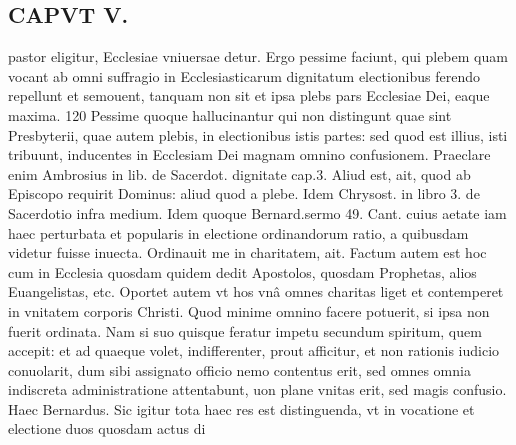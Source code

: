 \documentclass{article}
\begin{document}
\begin{pages}
\section*{CAPVT V. }
\marginpar{[ p.349 ]}\pstart pastor eligitur, Ecclesiae vniuersae detur. Ergo pessime faciunt, qui plebem quam vocant ab omni suffragio in Ecclesiasticarum dignitatum electionibus ferendo repellunt et semouent, tanquam non sit et ipsa plebs pars Ecclesiae Dei, eaque maxima. 120 Pessime quoque hallucinantur qui non distingunt quae sint Presbyterii, quae autem plebis, in electionibus istis partes: sed quod est illius, isti tribuunt, inducentes in Ecclesiam Dei magnam omnino confusionem. Praeclare enim Ambrosius in lib.  de Sacerdot. dignitate cap.3. Aliud est, ait, quod ab Episcopo requirit Dominus: aliud quod a plebe. Idem Chrysost. in libro 3. de Sacerdotio infra medium. Idem quoque Bernard.sermo 49. Cant. cuius aetate iam haec perturbata et popularis in electione ordinandorum ratio, a quibusdam videtur fuisse inuecta. Ordinauit me in charitatem, ait. Factum autem est hoc cum in Ecclesia quosdam quidem dedit Apostolos, quosdam Prophetas, alios Euangelistas, etc. Oportet autem vt hos vnâ omnes charitas liget et contemperet in vnitatem corporis Christi. Quod minime omnino facere potuerit, si ipsa non fuerit ordinata. Nam si suo quisque feratur impetu secundum spiritum, quem accepit: et ad quaeque volet, indifferenter, prout afficitur, et non rationis iudicio conuolarit, dum sibi assignato officio nemo contentus erit, sed omnes omnia indiscreta administratione attentabunt, uon plane vnitas erit, sed magis confusio. Haec Bernardus. Sic igitur tota haec res est distinguenda, vt in vocatione et electione duos quosdam actus di\pend

\end{pages}
\end{document}
